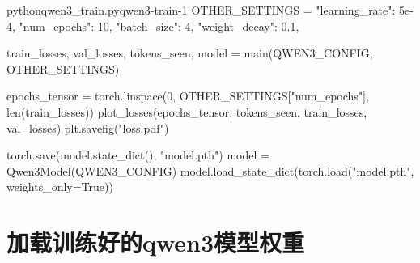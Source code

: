 \documentclass[lang=cn,newtx,10pt,scheme=chinese]{elegantbook}
\begin{document}
\begin{codebox}{python}{qwen3\_train.py}{qwen3-train-1}
    OTHER_SETTINGS = {
        "learning_rate": 5e-4,
        "num_epochs": 10,
        "batch_size": 4,
        "weight_decay": 0.1,
    }

    train_losses, val_losses, tokens_seen, model = main(QWEN3_CONFIG, OTHER_SETTINGS)

    epochs_tensor = torch.linspace(0, OTHER_SETTINGS["num_epochs"], len(train_losses))
    plot_losses(epochs_tensor, tokens_seen, train_losses, val_losses)
    plt.savefig("loss.pdf")

    torch.save(model.state_dict(), "model.pth")
    model = Qwen3Model(QWEN3_CONFIG)
    model.load_state_dict(torch.load("model.pth", weights_only=True))
\end{codebox}

\section{加载训练好的qwen3模型权重}
\end{document}
